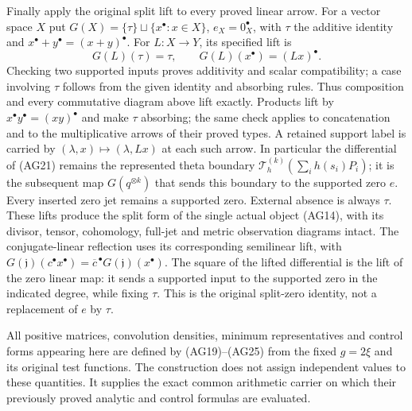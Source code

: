 Finally apply the original split lift to every proved linear arrow.
For a vector space $X$ put
$G(X)=\{\tau\}\sqcup\{x^\bullet:x\in X\}$,
$e_X=0_X^\bullet$, with $\tau$ the additive identity and
$x^\bullet+y^\bullet=(x+y)^\bullet$.
For $L:X\to Y$, its specified lift is
\[
 G(L)(\tau)=\tau,\qquad G(L)(x^\bullet)=(Lx)^\bullet.
 \tag{AG38}
\]
Checking two supported inputs proves additivity and scalar
compatibility; a case involving $\tau$ follows from the given
identity and absorbing rules.  Thus composition and every
commutative diagram above lift exactly.  Products lift by
$x^\bullet y^\bullet=(xy)^\bullet$ and make $\tau$ absorbing;
the same check applies to concatenation and to the multiplicative
arrows of their proved types.  A retained support label is carried
by $(\lambda,x)\mapsto(\lambda,Lx)$ at each such arrow.
In particular the differential of (AG21) remains the represented
theta boundary $\mathcal T_h^{(k)}(\sum_i h(s_i)P_i)$; it is
the subsequent map $G(q^{\otimes k})$ that sends this boundary
to the supported zero $e$.  Every inserted zero jet remains a
supported zero.  External
absence is always $\tau$.  These lifts produce the split form of
the single actual object (AG14), with its divisor, tensor,
cohomology, full-jet and metric observation diagrams intact.
The conjugate-linear reflection uses its corresponding semilinear
lift, with $G(\mathfrak j)(c^\bullet x^\bullet)
=\overline c^{\,\bullet}G(\mathfrak j)(x^\bullet)$.
The square of the lifted differential is the lift of the zero
linear map: it sends a supported input to the supported zero
in the indicated degree, while fixing $\tau$.  This is the
original split-zero identity, not a replacement of $e$ by $\tau$.

All positive matrices, convolution densities, minimum representatives
and control forms appearing here are defined by (AG19)--(AG25)
from the fixed $g=2\xi$ and its original test functions.  The
construction does not assign independent values to these quantities.
It supplies the exact common arithmetic carrier on which their
previously proved analytic and control formulas are evaluated.
